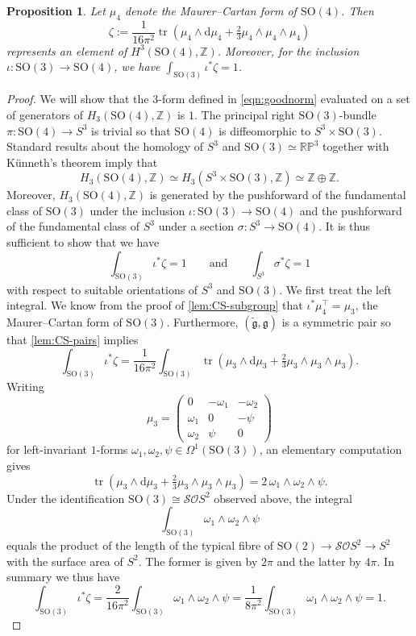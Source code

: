 \documentclass[british,11pt,a4paper]{amsart}
\numberwithin{equation}{section}
\newcommand\Cal{\mathcal}
\newcommand{\deq}{:=}
\newcommand{\tr}{\operatorname{tr}}
\newcommand{\Z}{\mathbb{Z}}
\renewcommand*{\d}{\mathrm{d}}
\newcommand{\col}{:}
\newcounter{theorem}
\numberwithin{theorem}{section}
\newtheorem{prop}[theorem]{Proposition}
\theoremstyle{definition}
\theoremstyle{remark}
\begin{document}
\begin{prop}\label{prop:normalization}
Let $\mu_4$ denote the Maurer--Cartan form of $\mathrm{SO}(4)$. Then
\begin{equation}\label{eqn:goodnorm}
\zeta\deq\frac{1}{16\pi^2}\tr\left(\mu_4\wedge \d
\mu_4+\tfrac{2}{3}\mu_4\wedge\mu_4\wedge\mu_4\right)
\end{equation}
represents an element of $H^3(\mathrm{SO}(4),\Z)$.  Moreover, for the
  inclusion $\iota:\mathrm{SO}(3)\to \mathrm{SO}(4)$, we have
  $\int_{\mathrm{SO}(3)}\iota^*\zeta=1$.
\end{prop}
\begin{proof}
We will show that the $3$-form defined in \eqref{eqn:goodnorm} evaluated on a set of
generators of $H_3(\mathrm{SO}(4),\Z)$ is $1$.  The principal right
$\mathrm{SO}(3)$-bundle $\pi \col \mathrm{SO}(4) \to S^3$ is trivial so that
$\mathrm{SO}(4)$ is diffeomorphic to $S^3\times \mathrm{SO}(3)$. Standard results
about the homology of $S^3$ and $\mathrm{SO}(3)\simeq \mathbb{RP}^3$ together with
K\"unneth's theorem imply that
\[
H_3(\mathrm{SO}(4),\Z)\simeq H_3(S^3\times \mathrm{SO}(3),\Z)\simeq \Z \oplus \Z. 
\]
Moreover, $H_3(\mathrm{SO}(4),\Z)$ is generated by the pushforward of the fundamental
class of $\mathrm{SO}(3)$ under the inclusion $\iota \col \mathrm{SO}(3) \to
\mathrm{SO}(4)$ and the pushforward of the fundamental class of $S^3$ under a section
$\sigma \col S^3 \to \mathrm{SO}(4)$. It is thus sufficient to show that we have
\begin{equation}\label{eqn:integrals}
\int_{\mathrm{SO}(3)}\iota^*\zeta=1 \qquad \text{and}\qquad \int_{S^3}\sigma^*\zeta=1
\end{equation}
with respect to suitable orientations of $S^3$ and $\mathrm{SO}(3)$. We first treat
the left integral.  We know from the proof of \cref{lem:CS-subgroup}
  that $\iota^*\mu_4^\top=\mu_3$, the Maurer--Cartan form of
$\mathrm{SO}(3)$. Furthermore, $(\tilde{\mathfrak{g}},\mathfrak{g})$ is a symmetric
pair so that \cref{lem:CS-pairs} implies
\[
\int_{\mathrm{SO}(3)}\iota^*\zeta=\frac{1}{16\pi^2}\int_{\mathrm{SO}(3)}\tr\left(\mu_3\wedge\d\mu_3+\tfrac{2}{3}\mu_3\wedge\mu_3\wedge\mu_3\right).
\]
Writing
\[
\mu_3=\begin{pmatrix} 0 & -\omega_1 & -\omega_2 \\ \omega_1 & 0 & -\psi \\ \omega_2 & \psi & 0 \end{pmatrix}
\]
for left-invariant $1$-forms $\omega_1,\omega_2,\psi \in \Omega^1(\mathrm{SO}(3))$, an elementary computation gives
\[
\tr\left(\mu_3\wedge\d\mu_3+\tfrac{2}{3}\mu_3\wedge\mu_3\wedge\mu_3\right)=2\,\omega_1\wedge\omega_2\wedge\psi.
\]
Under the identification $\mathrm{SO}(3)\cong\Cal{SO}S^2$ observed above, the integral 
\[
\int_{\mathrm{SO}(3)}\omega_1\wedge\omega_2\wedge\psi
\] 
equals the product of the length of the typical fibre of $\mathrm{SO}(2)\to \mathcal{SO}S^2 \to S^2$ with the surface area of $S^2$. The former is given by $2\pi$ and the latter by $4\pi$. In summary we thus have
\[
\int_{\mathrm{SO}(3)}\iota^*\zeta=\frac{2}{16\pi^2}\int_{\mathrm{SO}(3)}\omega_1\wedge\omega_2\wedge\psi=\frac{1}{8\pi^2}\int_{\mathrm{SO}(3)}\omega_1\wedge\omega_2\wedge\psi=1. 
\]


\end{proof}
\end{document}
